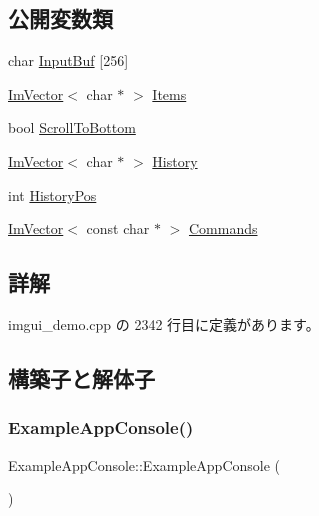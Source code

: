 \subsection*{公開変数類}
\begin{DoxyCompactItemize}
\item 
char \mbox{\hyperlink{struct_example_app_console_ab30accde81ae6833bd2ecf35f43f01ab}{Input\+Buf}} \mbox{[}256\mbox{]}
\item 
\mbox{\hyperlink{class_im_vector}{Im\+Vector}}$<$ char $\ast$ $>$ \mbox{\hyperlink{struct_example_app_console_acfde7d45fb733ac72d5d500168557b36}{Items}}
\item 
bool \mbox{\hyperlink{struct_example_app_console_a69b1406795fd71a3757761b0767ea1c5}{Scroll\+To\+Bottom}}
\item 
\mbox{\hyperlink{class_im_vector}{Im\+Vector}}$<$ char $\ast$ $>$ \mbox{\hyperlink{struct_example_app_console_a11c7fa54e744288f3606e4d6521d6345}{History}}
\item 
int \mbox{\hyperlink{struct_example_app_console_a2508db0a7d205947cea65b141d4ed589}{History\+Pos}}
\item 
\mbox{\hyperlink{class_im_vector}{Im\+Vector}}$<$ const char $\ast$ $>$ \mbox{\hyperlink{struct_example_app_console_a1eebee69cceb0345cf9d9b6e6beb9d03}{Commands}}
\end{DoxyCompactItemize}


\subsection{詳解}


 imgui\+\_\+demo.\+cpp の 2342 行目に定義があります。



\subsection{構築子と解体子}
\mbox{\label{struct_example_app_console_a405521e6aa8f97954b67315baf8d6147}} 
\subsubsection{\texorpdfstring{Example\+App\+Console()}{ExampleAppConsole()}}
{\footnotesize\ttfamily Example\+App\+Console\+::\+Example\+App\+Console (\begin{DoxyParamCaption}{ }\end{DoxyParamCaption})\hspace{0.3cm}{\ttfamily [inline]}}




